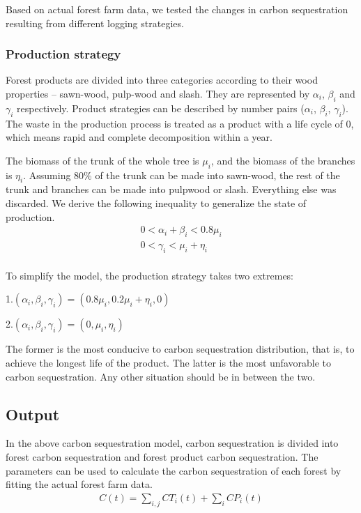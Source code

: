 Based on actual forest farm data, we tested the changes in carbon sequestration resulting from different logging strategies.

\subsubsection{Production strategy}
Forest products are divided into three categories according to their wood properties -- sawn-wood, pulp-wood and slash. They are represented by $\alpha_i$, $\beta_i$ and $\gamma_i$ respectively. Product strategies can be described by number pairs ($\alpha_i$, $\beta_i$, $\gamma_i$). The waste in the production process is treated as a product with a life cycle of 0, which means rapid and complete decomposition within a year.

The biomass of the trunk of the whole tree is $\mu_i$, and the biomass of the branches is $\eta_i$. Assuming 80\% of the trunk can be made into sawn-wood, the rest of the trunk and branches can be made into pulpwood or slash. Everything else was discarded. We derive the following inequality to generalize the state of production.
\begin{equation}
\begin{array}{c}
0<\alpha_{i}+\beta_{i}<0.8 \mu_{i} \\
0<\gamma_{i}< \mu_{i}+\eta_{i} \\
\end{array}
\end{equation}

To simplify the model, the production strategy takes two extremes:

1.$\left(\alpha_{i}, \beta_{i}, \gamma_{i}\right)=\left(0.8 \mu_{i}, 0.2 \mu_{i}+\eta_{i}, 0\right)$

2.$\left(\alpha_{i}, \beta_{i}, \gamma_{i}\right)=\left(0, \mu_{i}, \eta_{i}\right)$

The former is the most conducive to carbon sequestration distribution, that is, to achieve the longest life of the product. The latter is the most unfavorable to carbon sequestration. Any other situation should be in between the two.

\subsection{Output}
In the above carbon sequestration model, carbon sequestration is divided into forest carbon sequestration and forest product carbon sequestration. The parameters can be used to calculate the carbon sequestration of each forest by fitting the actual forest farm data.
\begin{equation}
\begin{array}{c}

C(t)=\sum_{i,j}CT_{i}(t)+\sum_{i}CP_{i}(t)

\end{array}
\end{equation}